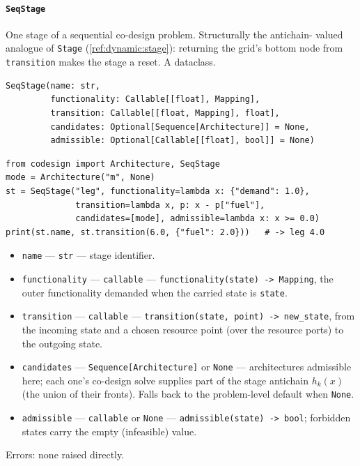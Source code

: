\documentclass[11pt,a4paper]{article}
\begin{document}
\paragraph{\texttt{SeqStage}}\label{ref:sequential:seqstage}
One stage of a sequential co-design problem. Structurally the antichain-
valued analogue of \texttt{Stage} (\ref{ref:dynamic:stage}): returning the
grid's bottom node from \texttt{transition} makes the stage a reset. A
dataclass.
\begin{lstlisting}
SeqStage(name: str,
         functionality: Callable[[float], Mapping],
         transition: Callable[[float, Mapping], float],
         candidates: Optional[Sequence[Architecture]] = None,
         admissible: Optional[Callable[[float], bool]] = None)
\end{lstlisting}
\begin{lstlisting}
from codesign import Architecture, SeqStage
mode = Architecture("m", None)
st = SeqStage("leg", functionality=lambda x: {"demand": 1.0},
              transition=lambda x, p: x - p["fuel"],
              candidates=[mode], admissible=lambda x: x >= 0.0)
print(st.name, st.transition(6.0, {"fuel": 2.0}))   # -> leg 4.0
\end{lstlisting}
\begin{itemize}[nosep]
  \item \texttt{name} --- \texttt{str} --- stage identifier.
  \item \texttt{functionality} --- \texttt{callable} ---
    \texttt{functionality(state) -> Mapping}, the outer functionality
    demanded when the carried state is \texttt{state}.
  \item \texttt{transition} --- \texttt{callable} ---
    \texttt{transition(state, point) -> new\_state}, from the incoming state
    and a chosen resource point (over the resource ports) to the outgoing
    state.
  \item \texttt{candidates} --- \texttt{Sequence[Architecture]} or
    \texttt{None} --- architectures admissible here; each one's co-design
    solve supplies part of the stage antichain $h_k(x)$ (the union of their
    fronts). Falls back to the problem-level default when \texttt{None}.
  \item \texttt{admissible} --- \texttt{callable} or \texttt{None} ---
    \texttt{admissible(state) -> bool}; forbidden states carry the empty
    (infeasible) value.
\end{itemize}
Errors: none raised directly.
\end{document}
